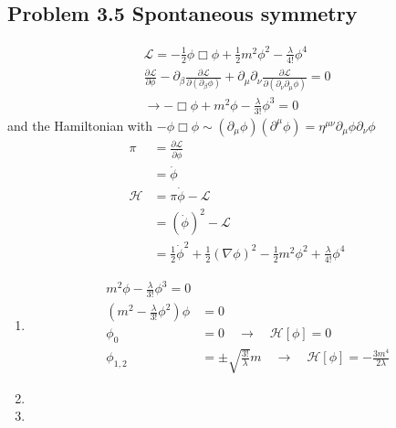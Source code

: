 \documentclass[10pt,a4paper]{book}
\theoremstyle{definition}
\begin{document}
\subsection{Problem 3.5 Spontaneous symmetry}
\begin{align}
\mathscr{L}=-\frac{1}{2}\phi\Box\phi+\frac{1}{2}m^2\phi^2-\frac{\lambda}{4!}\phi^4\\
    \frac{\partial\mathscr{L}}{\partial \phi}-\partial_\beta\frac{\partial\mathscr{L}}{\partial(\partial_\beta \phi)}+\partial_\mu\partial_\nu\frac{\partial \mathcal{L}}{\partial(\partial_\nu\partial_\mu\phi)}=0\\
    \rightarrow -\Box\phi+m^2\phi-\frac{\lambda}{3!}\phi^3=0
\end{align}
and the Hamiltonian with $-\phi\Box\phi\sim(\partial_\mu\phi)(\partial^\mu\phi)=\eta^{\mu\nu}\partial_\mu\phi\partial_\nu\phi$
\begin{align}
\pi
&=\frac{\partial\mathcal{L}}{\partial\dot\phi}\\
&=\dot\phi\\
\mathcal{H}
&=\pi\dot\phi-\mathcal{L}\\
&=(\dot\phi)^2-\mathcal{L}\\
&=\frac{1}{2}\dot\phi^2+\frac{1}{2}(\nabla\phi)^2-\frac{1}{2}m^2\phi^2+\frac{\lambda}{4!}\phi^4
\end{align}
\begin{enumerate}[label=(\alph*)]
\item 
\begin{align}
m^2\phi-\frac{\lambda}{3!}\phi^3=0\\
(m^2-\frac{\lambda}{3!}\phi^2)\phi&=0\\
\phi_0&=0\quad\rightarrow\quad\mathcal{H}[\phi]=0\\
\phi_{1,2}&=\pm\sqrt{\frac{3!}{\lambda}}m\quad\rightarrow\quad\mathcal{H}[\phi]=-\frac{3m^4}{2\lambda}
\end{align} 

\item
\item   
\end{enumerate}
\end{document}
